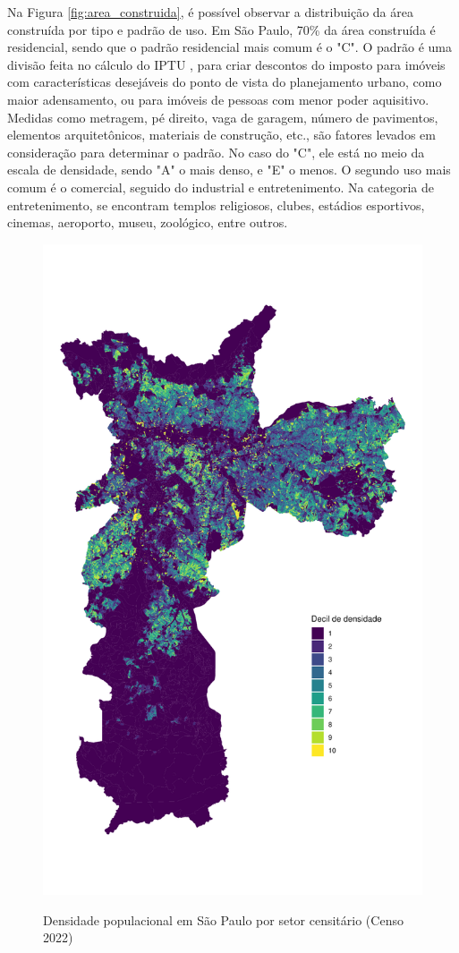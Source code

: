 \begin{apendicesenv}
Na Figura \ref{fig:area_construida}, é possível observar a distribuição da área construída por tipo e padrão de uso. Em São Paulo, 70\% da área construída é residencial, sendo que o padrão residencial mais comum é o "C". O padrão é uma divisão feita no cálculo do IPTU \cite{lei10235_1986}, para criar descontos do imposto para imóveis com características desejáveis do ponto de vista do planejamento urbano, como maior adensamento, ou para imóveis de pessoas com menor poder aquisitivo. Medidas como metragem, pé direito, vaga de garagem, número de pavimentos, elementos arquitetônicos, materiais de construção, etc., são fatores levados em consideração para determinar o padrão. No caso do "C", ele está no meio da escala de densidade, sendo "A" o mais denso, e "E" o menos. O segundo uso mais comum é o comercial, seguido do industrial e entretenimento. Na categoria de entretenimento, se encontram templos religiosos, clubes, estádios esportivos, cinemas, aeroporto, museu, zoológico, entre outros.



\clearpage

\begin{figure}[!h]
    \centering
    \caption{Densidade populacional em São Paulo por setor censitário (Censo 2022)}
    \includegraphics[width = .85\linewidth]{figuras/mapa-densidade.pdf}
    \label{fig:populacao}
\end{figure}



\end{apendicesenv}
